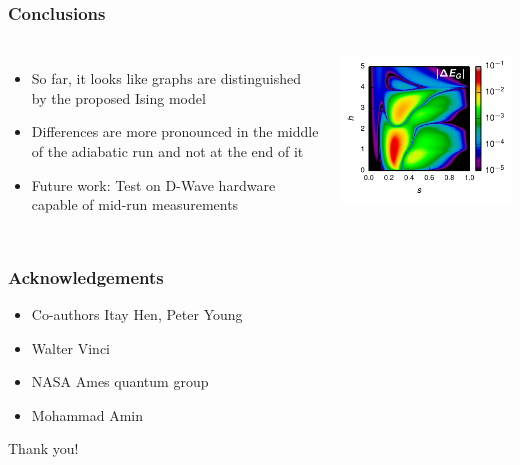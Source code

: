 \documentclass{beamer}
\begin{document}
\begin{frame}
  \frametitle{Conclusions}
  \begin{columns}
    \begin{itemize}
      \item So far, it looks like graphs are distinguished by the proposed
        Ising model
      \item Differences are more pronounced in the middle of the adiabatic run
        and not at the end of it
      \item \alert{Future work:} Test on D-Wave hardware capable of mid-run
        measurements
    \end{itemize}
    
    \includegraphics{delta-Eg}
  \end{columns}
\end{frame}

\begin{frame}
  \frametitle{Acknowledgements}
  \begin{itemize}
    \item Co-authors Itay Hen, Peter Young
    \item Walter Vinci
    \item NASA Ames quantum group
    \item Mohammad Amin
  \end{itemize}
  \vfill
  \begin{center}
    \huge Thank you!
  \end{center}
\end{frame}
\end{document}
